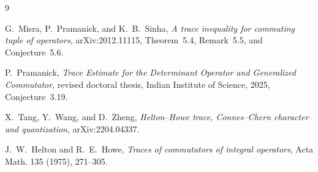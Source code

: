 \documentclass[11pt]{article}
\begin{document}
\begin{thebibliography}{9}

G.~Misra, P.~Pramanick, and K.~B.~Sinha,
\emph{A trace inequality for commuting tuple of operators},
arXiv:2012.11115, Theorem~5.4, Remark~5.5, and Conjecture~5.6.

P.~Pramanick,
\emph{Trace Estimate for the Determinant Operator and Generalized
Commutator}, revised doctoral thesis, Indian Institute of Science, 2025,
Conjecture~3.19.

X.~Tang, Y.~Wang, and D.~Zheng,
\emph{Helton--Howe trace, Connes--Chern character and quantization},
arXiv:2204.04337.

J.~W.~Helton and R.~E.~Howe,
\emph{Traces of commutators of integral operators},
Acta Math. 135 (1975), 271--305.

\end{thebibliography}
\end{document}
